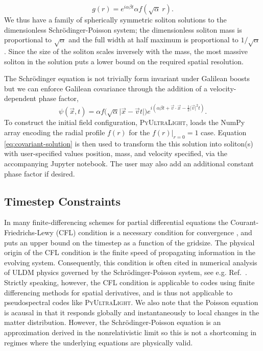 \documentclass[a4paper,11pt]{article}
\newcommand{\PyUltraLight}{\textsc{PyUltraLight}\xspace}
\begin{document}
\begin{equation}
    g(r)=e^{i\alpha\beta t}\alpha f(\sqrt{\alpha}\ r).
\end{equation}
We thus have a family of spherically symmetric soliton solutions to the dimensionless Schr{\"o}\-dinger-Poisson system; the dimensionless soliton mass is proportional to $\sqrt{\alpha}$ and the full width at half maximum is proportional to $1/\sqrt{\alpha}$. Since the size of the soliton scales inversely with the mass, the most massive soliton in the solution  puts a lower bound on the required spatial resolution. 

The Schr{\"o}dinger equation is not trivially form invariant under Galilean boosts but we can enforce Galilean covariance through the addition of a velocity-dependent phase factor,
%
\begin{equation}\label{eq:covariant-solution}
    \psi(\vec{x},t)=\alpha f\big(\sqrt{\alpha}\vert\vec{x}-\vec{v}t\vert\big)e^{i\left(\alpha\beta t+\vec{v}\cdot\vec{x}-\frac{1}{2}\vert\vec{v}\vert^2t\right)}.
\end{equation}
%
To construct the initial field configuration,  \PyUltraLight, loads the NumPy array encoding the radial profile $f(r)$ for the $\left. f(r)\right|_{r=0}=1$ case. Equation \ref{eq:covariant-solution} is then used to transform the this solution into soliton(s) with user-specified values position, mass, and velocity specified, via the accompanying Jupyter notebook. The user may also add an additional constant phase factor if desired.

\subsection{Timestep Constraints}

In many finite-differencing schemes for  partial differential equations the Courant-Friedrichs-Lewy (CFL) condition is a necessary condition for convergence \cite{Ajaib2013}, and puts an upper bound on the timestep as a function of the gridsize. The physical origin of the CFL condition is the finite speed of propagating information  in the evolving system.  Consequently, this condition is often cited in numerical analysis of ULDM physics governed by the Schr{\"o}dinger-Poisson system, see e.g. Ref.~\cite{Schwabe2016}. Strictly speaking, however, the CFL condition is applicable to codes using finite differencing methods for spatial derivatives, and is thus not applicable to pseudospectral codes like \PyUltraLight.   We also note that the Poisson equation is acausal in that it responds globally and instantaneously to local changes in the matter distribution. However, the Schr{\"o}dinger-Poisson equation is an approximation derived  in the nonrelativistic limit so this is not a shortcoming in regimes where the underlying equations are physically valid.
\end{document}
